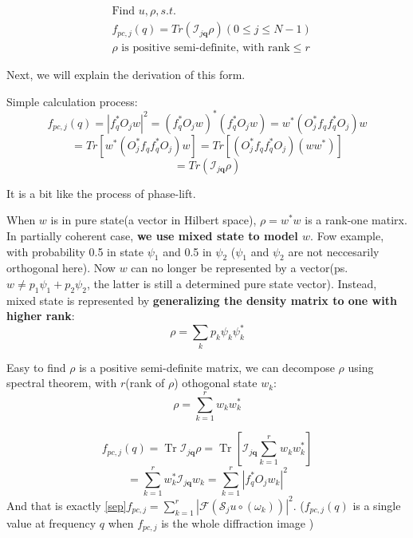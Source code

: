 \documentclass{article}
\numberwithin{equation}{section}
\begin{document}
\begin{equation}
\label{lift}
\begin{aligned}
&\mbox{Find } u,\rho,s.t.\\
&f_{pc,j}(q) = Tr(\mathcal{I}_{j \mathbf{q}} \rho ) (0\leq j \leq N-1)\\
&\rho \mbox{ is positive semi-definite, with rank}\leq r 
\end{aligned}
\end{equation}

Next, we will explain the derivation of this form.

 Simple calculation process:
$$
f_{pc,j}(q) = |f_q^*O_j w|^2 = (f_q^*O_j w)^*(f_q^*O_j w) = w^*(O_j^*f_qf_q^*O_j)w
$$
$$
=Tr[w^*(O_j^*f_qf_q^*O_j)w]=Tr[(O_j^*f_qf_q^*O_j) (ww^*)]
$$
$$
=Tr(  \mathcal{I}_{j \mathbf{q}} \rho )
$$





It is a bit like the process of phase-lift. 



When $w$ is in pure state(a vector in Hilbert space), $\rho=w^*w$ is a rank-one matirx. In partially coherent case, \textbf{we use mixed state to model $w$}. Fow example, with probability 0.5 in state $\psi_1$ and 0.5 in $\psi_2$ ($\psi_1$ and $\psi_2$ are not neccesarily orthogonal here). Now $w$ can no longer be represented by a vector(ps. $w \neq p_1\psi_1 + p_2 \psi_2$, the latter is still a determined pure state vector). Instead, mixed state is represented by \textbf{generalizing the density matrix to one with higher rank}: 
$$
\rho = \sum_k p_k \psi_k \psi_k^*
$$



Easy to find $\rho$ is a positive semi-definite matrix, we can decompose $\rho$ using spectral theorem, with $r$(rank of $\rho$) othogonal state $w_k$:
\begin{equation}
\label{ort}
\rho = \sum_{k=1}^{r} w_k w_k^*
\end{equation}



$$
 f_{pc,j}(q) = \operatorname{Tr} \mathcal{I}_{j \mathbf{q}} \rho
 = \operatorname{Tr}[ \mathcal{I}_{j \mathbf{q}}  \sum_{k=1}^{r} w_k w_k^*]
$$
$$
=
\sum_{k=1}^r w_k^*\mathcal{I}_{j \mathbf{q}} w_k 
=
\sum_{k=1}^r |f_q^*O_j w_k|^2 
$$
And that is exactly \eqref{sep}$
 f_{pc,j}=\sum_{k=1}^r \left|\mathcal{F}\left( \mathcal{S}_{j} u \circ \left(\omega_k\right) \right)\right|^{2}  
$. ($f_{pc,j}(q)$ is a single value at frequency $q$ when $f_{pc,j}$ is the whole diffraction image )
\end{document}
